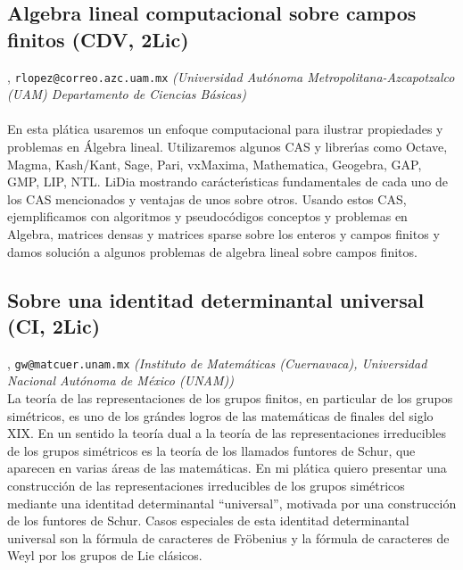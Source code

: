 \subsection{\sffamily Algebra lineal computacional sobre campos finitos {\footnotesize (CDV, 2Lic)}} \label{reg-1704} 
, {\tt rlopez@correo.azc.uam.mx}  {\slshape (Universidad Aut\'onoma Metropolitana-Azcapotzalco (UAM) Departamento de Ciencias B\'asicas)}\\
\\
\noindent En esta pl\'atica usaremos un enfoque computacional para ilustrar propiedades y problemas en \'Algebra lineal. Utilizaremos algunos CAS y librer\'{\i}as como Octave, Magma, Kash/Kant, Sage, Pari, vxMaxima, Mathematica, Geogebra, GAP, GMP, LIP, NTL.  LiDia mostrando car\'acter\'{\i}sticas fundamentales de cada uno de los CAS mencionados y ventajas de unos sobre otros. Usando estos CAS, ejemplificamos con algoritmos y pseudoc\'odigos conceptos y problemas en Algebra, matrices densas y matrices sparse sobre los enteros y campos finitos y damos soluci\'on a algunos problemas de algebra lineal sobre campos finitos.
\subsection{\sffamily Sobre una identitad determinantal universal {\footnotesize (CI, 2Lic)}} \label{reg-843} 
, {\tt gw@matcuer.unam.mx}  {\slshape (Instituto de Matem\'aticas (Cuernavaca), Universidad Nacional Aut\'onoma de M\'exico (UNAM))}\\
          \noindent La teor\'ia de las representaciones de los grupos finitos, en particular de los grupos sim\'etricos, es uno de los gr\'andes logros de las matem\'aticas de finales del siglo XIX. En un sentido la teor\'ia dual a la teor\'ia de las representaciones irreducibles de los grupos sim\'etricos es la teor\'ia de los llamados funtores de Schur, que aparecen en varias \'areas de las matem\'aticas. En mi pl\'atica quiero presentar una construcci\'on de las representaciones irreducibles de los grupos sim\'etricos mediante una identitad determinantal ``universal'', motivada por una construcci\'on de los funtores de Schur. Casos especiales de esta identitad determinantal universal son la f\'ormula de caracteres de Fr\"obenius y la f\'ormula de caracteres de Weyl por los grupos de Lie cl\'asicos.
